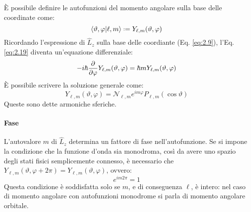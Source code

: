 È possibile definire le autofunzioni del momento angolare sulla base delle coordinate come:
\begin{equation}
	\braket{\vartheta,\varphi | \ell,m} \defeq Y_{\ell,m}(\vartheta,\varphi)
	\label{eq:2.22}
\end{equation}
Ricordando l'espressione di $ \hat{L}_z $ sulla base delle coordiante (Eq. \ref{eq:2.9}), l'Eq. \ref{eq:2.19} diventa un'equazione differenziale:
\begin{equation}
	-i\hbar \frac{\partial}{\partial \varphi} Y_{\ell,m}(\vartheta,\varphi) = \hbar m Y_{\ell,m}(\vartheta,\varphi)
	\label{eq:2.23}
\end{equation}
È possibile scrivere la soluzione generale come:
\begin{equation}
	Y_{\ell,m}(\vartheta,\varphi) = \mathcal{N}_{\ell,m} e^{im\varphi} P_{\ell,m}(\cos\vartheta)
	\label{eq:2.24}
\end{equation}
Queste sono dette armoniche sferiche.

\paragraph{Fase}

L'autovalore $ m $ di $ \hat{L}_z $ determina un fattore di fase nell'autofunzione. Se si impone la condizione che la funzione d'onda sia monodroma, così da avere uno spazio degli stati fisici semplicemente connesso, è necessario che $ Y_{\ell,m}(\vartheta,\varphi+2\pi) = Y_{\ell,m}(\vartheta,\varphi) $, ovvero:
\begin{equation}
	e^{im2\pi} = 1
	\label{eq:2.25}
\end{equation}
Questa condizione è soddisfatta solo se $ m $, e di conseguenza $ \ell $, è intero: nel caso di momento angolare con autofunzioni monodrome si parla di momento angolare orbitale.

